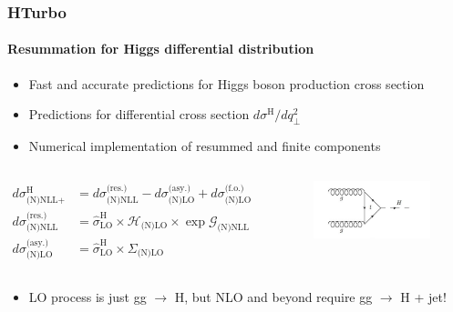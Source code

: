 \documentclass[aspectratio=43]{beamer}
\begin{document}
\begin{frame}


\end{frame}

\begin{frame}
	
	\frametitle{HTurbo}
	\framesubtitle{Resummation for Higgs differential distribution}

	\footnotesize
	
	\begin{itemize}
		\item Fast and accurate predictions for Higgs boson production cross section
		\item Predictions for differential cross section $d\sigma^{\textrm{H}} / dq_{\perp}^{2}$
		\item Numerical implementation of resummed and finite components
	\end{itemize}

	\begin{columns}
		

		\begin{align}
			d\sigma^{\textrm{H}}_{\textrm{(N)NLL+(N)LO}} &= 
			d\sigma^{\textrm{(res.)}}_{\textrm{(N)NLL}} - 
			d\sigma^{\textrm{(asy.)}}_{\textrm{(N)LO}} + 
			d\sigma^{\textrm{(f.o.)}}_{\textrm{(N)LO}} \nonumber \\
			d\sigma^{\textrm{(res.)}}_{\textrm{(N)NLL}} &= \hat{\sigma}^{\textrm{H}}_{\textrm{LO}} \times \mathcal{H}_{\textrm{(N)LO}} \times \exp{\mathcal{G}}_{\textrm{(N)NLL}} \; \nonumber \\
			d\sigma^{\textrm{(asy.)}}_{\textrm{(N)LO}} &= \hat{\sigma}^{\textrm{H}}_{\textrm{LO}} \times \Sigma_{\textrm{(N)LO}} \nonumber
		\end{align}
	
		
		\begin{figure}
			\includegraphics[width = 5 cm]{plots/part3/chapter5/higgs.png}
		\end{figure}	
		
	\end{columns}

	\begin{itemize}
		\item LO process is just gg $\rightarrow$ H, but NLO and beyond require gg $\rightarrow$ H + jet!
	\end{itemize}

\end{frame}
\end{document}
